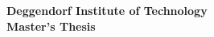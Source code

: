 \thispagestyle{empty}
\begin{titlepage}

  \begin{center}
    \vspace*{0.5cm}
    {\textbf{\large Deggendorf Institute of Technology}}\\[1.0cm]
    {\textbf{\huge Master's Thesis}}

    \vspace*{\fill}
    {\textbf{\large \thesistitleEN}}

    \vspace*{\fill}
    {\textbf{\large \student}}\\
    {\textbf{\large \Year}}
  \end{center}

\end{titlepage}
